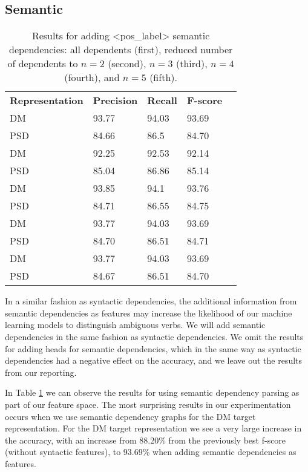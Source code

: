 \subsection{Semantic}
\label{results_sem}

\begin{table}
    \centering
    \smaller[0.2]
    \begin{tabular}{@{}lllll@{}}
        \toprule
        \textbf{Representation} & \textbf{Precision} & \textbf{Recall} & \textbf{F-score} \\
        DM &  93.77 & 94.03 & 93.69 \\
        PSD & 84.66 & 86.5 & 84.70 \\
        \midrule
        DM &  92.25 & 92.53 & 92.14 \\
        PSD & 85.04 & 86.86 & 85.14 \\
        \midrule
        DM &  93.85 & 94.1 & 93.76 \\
        PSD & 84.71 & 86.55 & 84.75 \\
        \midrule
        DM &  93.77 & 94.03 & 93.69 \\
        PSD & 84.70 & 86.51 & 84.71 \\
        \midrule
        DM &  93.77 & 94.03 & 93.69 \\
        PSD & 84.67 & 86.51 & 84.70 \\
        \bottomrule
    \end{tabular}
    \caption{Results for adding <pos\_label> semantic dependencies: all dependents (first), reduced number of dependents to $n=2$ (second), $n=3$ (third), $n=4$ (fourth), and $n=5$ (fifth).}
    \label{table:semantic_dependents_n}
\end{table}

In a similar fashion as syntactic dependencies, the additional information from semantic dependencies as features may increase the likelihood of our machine learning models to distinguish ambiguous verbs. We will add semantic dependencies in the same fashion as syntactic dependencies. We omit the results for adding heads for semantic dependencies, which in the same way as syntactic dependencies had a negative effect on the accuracy, and we leave out the results from our reporting.

In Table \ref{table:semantic_dependents_n} we can observe the results for using semantic dependency parsing as part of our feature space. The most surprising results in our experimentation occurs when we use semantic dependency graphs for the DM target representation. For the DM target representation we see a very large increase in the accuracy, with an increase from 88.20\% from the previously best f-score (without syntactic features), to 93.69\% when adding semantic dependencies as features.



